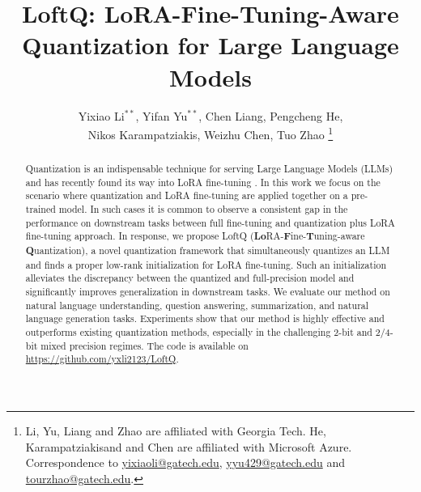 \documentclass[11pt]{article} %
\author{Yixiao Li$^{**}$, Yifan Yu$^{**}$, Chen Liang, Pengcheng He, \\Nikos Karampatziakis, Weizhu Chen, Tuo Zhao \footnote{Li, Yu, Liang and Zhao are affiliated with Georgia Tech. He, Karampatziakisand and Chen are affiliated with Microsoft Azure. Correspondence to \url{yixiaoli@gatech.edu}, \url{yyu429@gatech.edu} and \url{tourzhao@gatech.edu}.}}
\title{LoftQ: LoRA-Fine-Tuning-Aware Quantization for Large Language Models}
\newcommand{\OurAlg}{LoftQ}
\begin{document}
\maketitle

\def\thefootnote{**}

\begin{abstract}



Quantization is an indispensable technique for serving Large Language Models (LLMs) and has recently found its way into LoRA fine-tuning \citep{dettmers2023qlora}.
In this work we focus on the scenario where quantization and LoRA fine-tuning are applied together on a pre-trained model.  
In such cases it is common to observe a consistent gap in the performance on downstream tasks between full fine-tuning and quantization plus LoRA fine-tuning approach.
In response, we propose {\OurAlg} (\textbf{Lo}RA-\textbf{F}ine-\textbf{T}uning-aware \textbf{Q}uantization), a novel quantization framework that simultaneously quantizes an LLM and finds a proper low-rank initialization for LoRA fine-tuning. 
Such an initialization alleviates the discrepancy between the quantized and full-precision model and significantly improves generalization in downstream tasks.
We evaluate our method on natural language understanding, question answering, summarization, and natural language generation tasks. Experiments show that our method is highly effective and outperforms existing quantization methods, especially in the challenging 2-bit and 2/4-bit mixed precision regimes. 
The code is available on \url{https://github.com/yxli2123/LoftQ}.

\end{abstract}













\end{document}
